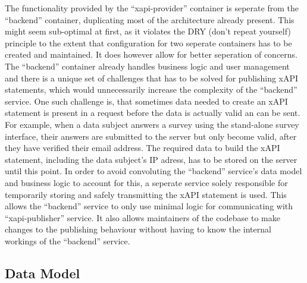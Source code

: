 \documentclass[a4paper,11pt]{article}
\begin{document}
                The functionality provided by the ``xapi-provider'' container
                is seperate from the ``backend'' container, duplicating
                most of the architecture already present. This might seem
                sub-optimal at first, as it violates the DRY (don't repeat yourself)
                principle to the extent that configuration for two seperate containers
                has to be created and maintained. It does however allow for better
                seperation of concerns. The ``backend'' container already
                handles business logic and user management and there is a unique
                set of challenges that has to be solved for publishing xAPI
                statements, which would unnecessarily increase the complexity
                of the ``backend'' service. One such challenge is, that sometimes
                data needed to create an xAPI statement is present in a request
                before the data is actually valid an can be sent. For example,
                when a data subject answers a survey using the stand-alone survey
                interface, their answers are submitted to the server but only
                become valid, after they have verified their email address.
                The required data to build the xAPI statement, including the data
                subject's IP adress, has to be stored on the server until this
                point. In order to avoid convoluting the ``backend'' service's
                data model and business logic to account for this, a seperate
                service solely responsible for temporarily storing and safely 
                transmitting the xAPI statement is used.
                This allows the ``backend'' service to only use minimal logic
                for communicating with ``xapi-publisher'' service.
                It also allows maintainers of the codebase to make changes
                to the publishing behaviour without having to know the internal
                workings of the ``backend'' service. 

        \subsection{Data Model}
\end{document}
